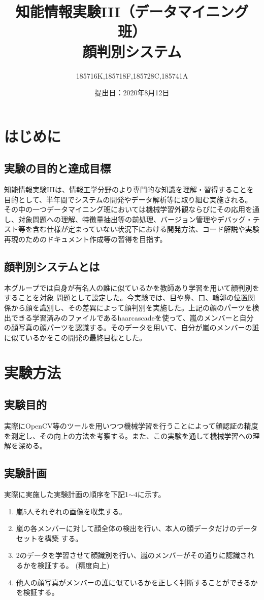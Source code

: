 \documentclass[a4paper, 11pt, titlepage]{jsarticle}
\title{知能情報実験III（データマイニング班）\\顔判別システム}
\author{185716K,185718F,185728C,185741A}
\date{提出日：2020年8月12日}
\begin{document}
\maketitle
\tableofcontents
\clearpage

\section{はじめに}
\subsection{実験の目的と達成目標}
知能情報実験IIIは、情報工学分野のより専門的な知識を理解・習得することを目的として、半年間でシステムの開発やデータ解析等に取り組む実施される。
その中の一つデータマイニング班においては機械学習外観ならびにその応用を通し、対象問題への理解、特徴量抽出等の前処理、バージョン管理やデバッグ・テスト等を含む仕様が定まっていない状況下における開発方法、コード解説や実験再現のためのドキュメント作成等の習得を目指す。

\subsection{顔判別システムとは}
本グループでは自身が有名人の誰に似ているかを教師あり学習を用いて顔判別をすることを対象 問題として設定した。今実験では、目や鼻、口、輪郭の位置関係から顔を識別し、その差異によって顔判別を実施した。上記の顔のパーツを検出できる学習済みのファイルであるhaarcascadeを使って、嵐のメンバーと自分の顔写真の顔パーツを認識する。そのデータを用いて、自分が嵐のメンバーの誰に似ているかをこの開発の最終目標とした。

\section{実験方法}
\subsection{実験目的}
実際にOpenCV等のツールを用いつつ機械学習を行うことによって顔認証の精度を測定し、その向上の方法を考察する。また、この実験を通して機械学習への理解を深める。

\subsection{実験計画}
実際に実施した実験計画の順序を下記1$\sim$4に示す。
\begin{enumerate}
\item{嵐5人それぞれの画像を収集する。}
\item{嵐の各メンバーに対して顔全体の検出を行い、本人の顔データだけのデータセットを構築
する。}
\item{2のデータを学習させて顔識別を行い、嵐のメンバーがその通りに認識されるかを検証する。
(精度向上)}
\item{他人の顔写真がメンバーの誰に似ているかを正しく判断することができるかを検証する。}
\end{enumerate}
\end{document}
